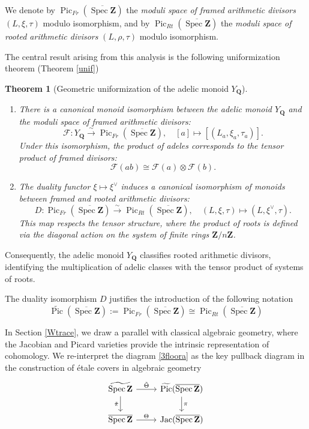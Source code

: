 \documentclass[11pt,a4paper]{article}
\newcommand{\Q}{\mathbf{Q}}
\newcommand{\Z}{\mathbf{Z}}
\def\spz{\Spec \Z}
\def\spzb{\overline{\Spec \Z}}
\newcommand{\Spec}{\operatorname{Spec}}
\def\Pic{\operatorname{Pic}}
\def\Jac{\operatorname{Jac}}
\def\tspz{\widetilde{\Pic}(\spzb)}
\def\spz{\Spec \Z}
\def\MFr{\operatorname{Pic}_{Fr}}
\def\MRt{\operatorname{Pic}_{Rt}}
\theoremstyle{plain}
\newtheorem{thm}{Theorem}[section]
\theoremstyle{definition} %
\begin{document}
We denote by $\MFr(\spzb)$  the \emph{moduli space of framed arithmetic divisors} $(L, \xi, \tau)$ modulo isomorphism, and by $\MRt(\spzb)$  the \emph{moduli space of rooted arithmetic divisors} $(L, \rho, \tau)$ modulo isomorphism.\vspace{.03in}

The central result arising from this analysis is the following uniformization theorem (Theorem \ref{unif})

\begin{thm}[Geometric uniformization of the adelic monoid $Y_\Q$]
\,
\begin{enumerate}
    \item There is a canonical monoid isomorphism between the adelic monoid $Y_\Q$ and the moduli space of framed arithmetic divisors:
    \[
    \mathcal{F}: Y_\Q \xrightarrow{\sim} \MFr(\spzb), \quad [a] \longmapsto [(L_a, \xi_a, \tau_a)].
    \]
    Under this isomorphism, the product of adeles corresponds to the tensor product of framed divisors:
    \[
    \mathcal{F}(ab) \cong \mathcal{F}(a) \otimes \mathcal{F}(b).
    \]
    
    \item The duality functor $\xi\mapsto \xi^\vee$ induces a canonical isomorphism of monoids between framed and rooted arithmetic divisors:
    \[
    D: \MFr(\spzb) \xrightarrow{\sim} \MRt(\spzb), \quad (L, \xi, \tau) \longmapsto (L, \xi^\vee, \tau).
    \]
    This map respects the tensor structure, where the product of roots is defined via the diagonal action on the system of finite rings $\Z/n\Z$.
\end{enumerate}
\end{thm}

Consequently, the adelic monoid $Y_\Q$ classifies rooted arithmetic divisors, identifying the multiplication of adelic classes with the tensor product of systems of roots.

The duality isomorphism $D$ justifies the introduction of the following notation
\begin{equation}\label{}
\tspz := \MFr(\spzb) \cong \MRt(\spzb)
\end{equation}





In Section \ref{Wtrace}, we draw a parallel with classical algebraic geometry, where the Jacobian and Picard varieties provide the intrinsic representation of cohomology. We re-interpret the diagram \eqref{3floora} as the key pullback diagram  in the construction of \'etale covers in algebraic geometry
\begin{equation}\label{}
\begin{tikzcd}
\widetilde{\spz} \arrow[r,"\tilde\Theta"]\arrow[d,"\tilde\pi"'] & \tspz\arrow[d,"\pi"]
 \\
\spzb \arrow[r, "\Theta"] & \Jac(\spzb)
\end{tikzcd}
\end{equation}
\end{document}
